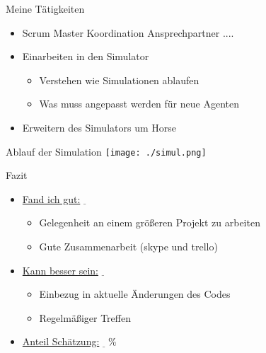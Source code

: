 \graphicspath{{images/}{images/logos/}}

\begin{frame}{Meine Tätigkeiten}
	\begin{itemize}
		\item Scrum Master
			\subitem Koordination
			\subitem Ansprechpartner
			\subitem ....
		\item Einarbeiten in den Simulator
			\begin{itemize}
				\item Verstehen wie Simulationen ablaufen
				\item Was muss angepasst werden für neue Agenten
			\end{itemize}
		\item Erweitern des Simulators um Horse
	\end{itemize}
\end{frame}  

\begin{frame}{Ablauf der Simulation}
	\texttt{[image: ./simul.png]}
\end{frame}

\begin{frame}{Fazit}
	\begin{itemize}
		\item 	\underline{Fand ich gut:} \newline $\underline{}$
			\begin{itemize}
				\item Gelegenheit an einem größeren Projekt zu arbeiten
				\item Gute Zusammenarbeit (skype und trello)
			\end{itemize}
		\newline
		\item \underline{Kann besser sein:} \newline $\underline{}$
			\begin{itemize}
				\item Einbezug in aktuelle Änderungen des Codes
				\item Regelmäßiger Treffen \newline
			\end{itemize}
		\item \underline{Anteil Schätzung:} $\underline{}$ \%
	\end{itemize}
\end{frame}